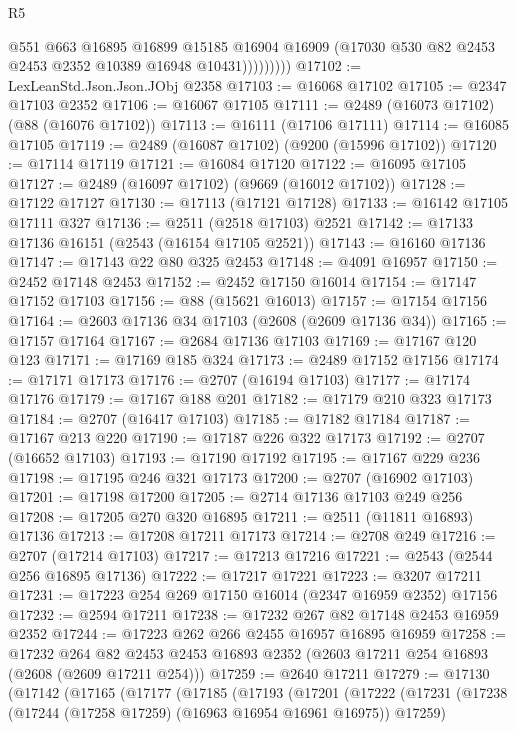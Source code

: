 \begin{lexlean}{R5}
\begin{coremodule}
                    @551
                    @663
                    @16895
                    @16899
                    @15185
                    @16904
                    @16909
                    (@17030 @530 @82 @2453 @2453 @2352 @10389 @16948 @10431)))))))))
@17102 := LexLeanStd.Json.Json.JObj @2358
@17103 := @16068 @17102
@17105 := @2347 @17103 @2352
@17106 := @16067 @17105
@17111 := @2489 (@16073 @17102) (@88 (@16076 @17102))
@17113 := @16111 (@17106 @17111)
@17114 := @16085 @17105
@17119 := @2489 (@16087 @17102) (@9200 (@15996 @17102))
@17120 := @17114 @17119
@17121 := @16084 @17120
@17122 := @16095 @17105
@17127 := @2489 (@16097 @17102) (@9669 (@16012 @17102))
@17128 := @17122 @17127
@17130 := @17113 (@17121 @17128)
@17133 := @16142 @17105 @17111 @327
@17136 := @2511 (@2518 @17103) @2521
@17142 := @17133 @17136 @16151 (@2543 (@16154 @17105 @2521))
@17143 := @16160 @17136
@17147 := @17143 @22 @80 @325 @2453
@17148 := @4091 @16957
@17150 := @2452 @17148 @2453
@17152 := @2452 @17150 @16014
@17154 := @17147 @17152 @17103
@17156 := @88 (@15621 @16013)
@17157 := @17154 @17156
@17164 := @2603 @17136 @34 @17103 (@2608 (@2609 @17136 @34))
@17165 := @17157 @17164
@17167 := @2684 @17136 @17103
@17169 := @17167 @120 @123
@17171 := @17169 @185 @324
@17173 := @2489 @17152 @17156
@17174 := @17171 @17173
@17176 := @2707 (@16194 @17103)
@17177 := @17174 @17176
@17179 := @17167 @188 @201
@17182 := @17179 @210 @323 @17173
@17184 := @2707 (@16417 @17103)
@17185 := @17182 @17184
@17187 := @17167 @213 @220
@17190 := @17187 @226 @322 @17173
@17192 := @2707 (@16652 @17103)
@17193 := @17190 @17192
@17195 := @17167 @229 @236
@17198 := @17195 @246 @321 @17173
@17200 := @2707 (@16902 @17103)
@17201 := @17198 @17200
@17205 := @2714 @17136 @17103 @249 @256
@17208 := @17205 @270 @320 @16895
@17211 := @2511 (@11811 @16893) @17136
@17213 := @17208 @17211 @17173
@17214 := @2708 @249
@17216 := @2707 (@17214 @17103)
@17217 := @17213 @17216
@17221 := @2543 (@2544 @256 @16895 @17136)
@17222 := @17217 @17221
@17223 := @3207 @17211
@17231 := @17223 @254 @269 @17150 @16014 (@2347 @16959 @2352) @17156
@17232 := @2594 @17211
@17238 := @17232 @267 @82 @17148 @2453 @16959 @2352
@17244 := @17223 @262 @266 @2455 @16957 @16895 @16959
@17258 := @17232
    @264
    @82
    @2453
    @2453
    @16893
    @2352
    (@2603 @17211 @254 @16893 (@2608 (@2609 @17211 @254)))
@17259 := @2640 @17211
@17279 := @17130
    (@17142
      (@17165
        (@17177
          (@17185
            (@17193
              (@17201
                (@17222
                  (@17231
                    (@17238 (@17244 (@17258 @17259) (@16963 @16954 @16961 @16975)) @17259)

\end{coremodule}
\end{lexlean}
